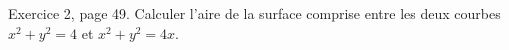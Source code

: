 \begin{exercice}\label{exoGeneral0024}

Exercice 2, page 49. Calculer l'aire de la surface comprise entre les deux courbes $x^2+y^2=4$ et $x^2+y^2=4x$.

\end{exercice}
